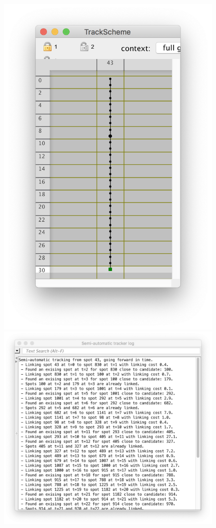 \begin{figure}
    \includegraphics[height=0.2\textheight]{figures/Mastodon_Tracklets_04.png}
    \hfill
    \includegraphics[height=0.2\textheight]{figures/Mastodon_Tracklets_05.png}

\end{figure}
